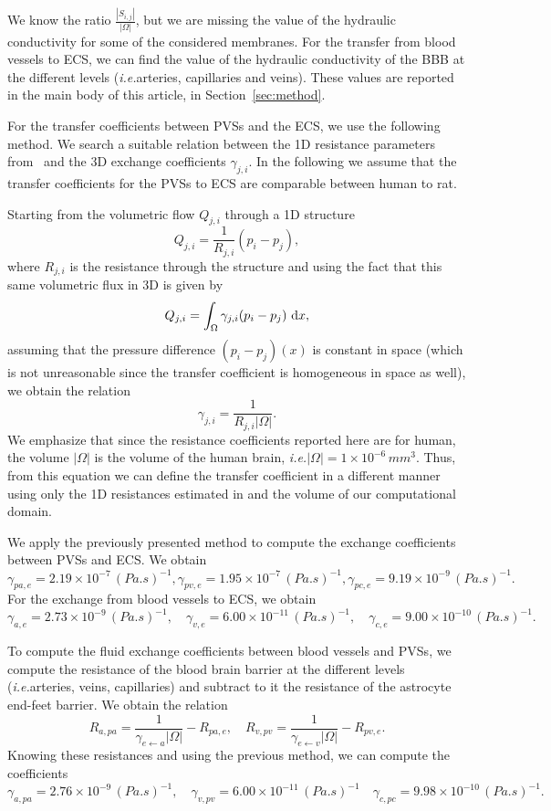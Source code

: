 \documentclass[10pt]{article}
\newcommand{\ie}{\emph{i.e.}\;}
\newcommand{\1}{^{(1)}}
\newcommand{\2}{^{(2)}}
\newcommand*{\dd}{\mathop{\kern0pt\mathrm{d}}\!{}}
\newcommand{\abs}[1]{\left\lvert#1\right\rvert}
\begin{document}
We know the ratio $\frac{\abs{S_{i,j}}}{\abs{\Omega}}$, but we are missing the value of the hydraulic conductivity for some of the considered membranes. For the transfer from blood vessels to ECS, we can find the value of the hydraulic conductivity of the BBB at the different levels (\ie arteries, capillaries and veins). These values are reported in the main body of this article, in Section~\ref{sec:method}.

For the transfer coefficients between PVSs and the ECS, we use the following method. We search a suitable relation between the 1D resistance parameters from~\cite{Vinje-2020-ICP} and the 3D exchange coefficients $\gamma_{j, i}$. 
In the following we assume that the transfer coefficients for the PVSs to ECS are comparable between human to rat.

Starting from the volumetric flow $Q_{j, i}$ through a 1D structure 
\[
    Q_{j, i} = \frac{1}{R_{j, i}}(p_i-p_j),
\]
where $R_{j, i}$ is the resistance through the structure and using the fact that this same volumetric flux in 3D is given by 
\[
    Q_{j, i} = \int_\Omega \gamma_{j , i}(p_i-p_j)\, \dd x,
\]
assuming that the pressure difference $(p_i-p_j)(x)$ is constant in space (which is not unreasonable since the transfer coefficient is homogeneous in space as well), we obtain the relation 
\[
    \gamma_{j , i } = \frac{1}{R_{j , i } \abs{\Omega}}.
\]
We emphasize that since the resistance coefficients reported here are for human, the volume $\abs{\Omega}$ is the volume of the human brain, \ie $\abs{\Omega} = 1\times 10^{-6}\, \si{mm^3}$. 
Thus, from this equation we can define the transfer coefficient in a different manner using only the 1D resistances estimated in \cite{Vinje-2020-ICP} and the volume of our computational domain.  

We apply the previously presented method to compute the exchange coefficients between PVSs and ECS. We obtain 
\[
    \gamma_{pa,e } = 2.19 \times 10^{-7}\,  \si{(Pa.s)^{-1}}, \gamma_{pv,e} = 1.95 \times 10^{-7} \, \si{(Pa.s)^{-1}}, \gamma_{pc,e} = 9.19 \times 10^{-9} \, \si{(Pa.s)^{-1}}. 
\]
For the exchange from blood vessels to ECS, we obtain
\[
    \gamma_{a,e} = 2.73 \times 10^{-9} \, \si{(Pa.s)^{-1}},\quad \gamma_{v,e} = 6.00 \times 10^{-11} \, \si{(Pa.s)^{-1}}, \quad  \gamma_{c,e} = 9.00 \times 10^{-10} \, \si{(Pa.s)^{-1}}.
\]


To compute the fluid exchange coefficients between blood vessels and PVSs, we compute the resistance of the blood brain barrier at the different levels (\ie arteries, veins, capillaries) and subtract to it the resistance of the astrocyte end-feet barrier. We obtain the relation 
\[
    R_{a,pa} = \frac{1}{\gamma_{e\leftarrow a}\abs{\Omega}} - R_{pa,e},\quad R_{v,pv} = \frac{1}{\gamma_{e\leftarrow v}\abs{\Omega}} - R_{pv,e}.
\]
Knowing these resistances and using the previous method, we can compute the coefficients 
\[
\gamma_{a,pa} = 2.76 \times 10^{-9} \, \si{(Pa.s)^{-1}}, \quad \gamma_{v,pv} = 6.00 \times 10^{-11}  \, \si{(Pa.s)^{-1}}\quad \gamma_{c,pc} = 9.98 \times 10^{-10}\, \si{(Pa.s)^{-1}}. 
\]
\end{document}
